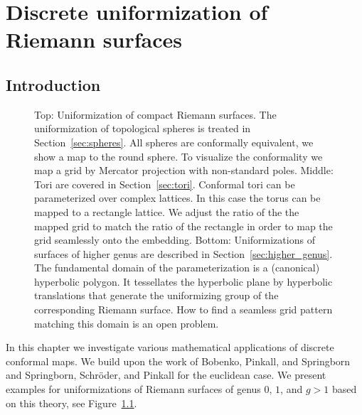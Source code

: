 \documentclass[Thesis]{subfiles}
\begin{document}

\chapter{Discrete uniformization of Riemann surfaces}
\label{chp:uniformization}

\section{Introduction}

\begin{figure}
\centering
{}
\caption{
Top: Uniformization of compact Riemann surfaces. 
The uniformization of topological spheres is treated in Section~\ref{sec:spheres}.
All spheres are conformally equivalent, we show a map to the round sphere. 
To visualize the conformality we map a grid by Mercator projection with non-standard poles.
Middle: Tori are covered in Section~\ref{sec:tori}.
Conformal tori can be parameterized over complex lattices. 
In this case the torus can be mapped to a rectangle lattice. 
We adjust the ratio of the the mapped grid to match the ratio of the rectangle in order to map the grid seamlessly onto the embedding.
Bottom: Uniformizations of surfaces of higher genus are described in Section~\ref{sec:higher_genus}.
The fundamental domain of the parameterization is a (canonical) hyperbolic polygon. 
It tessellates the hyperbolic plane by hyperbolic translations that generate the uniformizing group of the corresponding Riemann surface.
How to find a seamless grid pattern matching this domain is an open problem.
}
\label{fig:intro_uniformization}
\end{figure}

In this chapter we investigate various mathematical applications of discrete conformal maps. 
We build upon the work of Bobenko, Pinkall, and Springborn \cite{Bobenko2010} and Springborn, Schr\"{o}der, and Pinkall \cite{Springborn2008} for the euclidean case. We present examples for uniformizations of Riemann surfaces of genus $0$, $1$, and $g>1$ based on this theory, see Figure~\ref{fig:intro_uniformization}.
\end{document}
